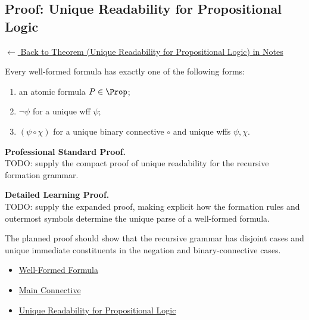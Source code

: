 \clearpage
\subsection*{Proof: Unique Readability for Propositional Logic}
\label{prf:unique-readability-propositional-logic}

\noindent\hyperref[thm:unique-readability-propositional-logic]{$\leftarrow$ Back to Theorem (Unique Readability for Propositional Logic) in Notes}

\begin{theorem*}
Every well-formed formula has exactly one of the following forms:
\begin{enumerate}
  \item an atomic formula $P\in\Prop$;
  \item $\neg\psi$ for a unique wff $\psi$;
  \item $(\psi\circ\chi)$ for a unique binary connective $\circ$ and unique
        wffs $\psi,\chi$.
\end{enumerate}
\end{theorem*}

\textbf{Professional Standard Proof.}~\\
TODO: supply the compact proof of unique readability for the recursive
formation grammar.

\medskip

\textbf{Detailed Learning Proof.}~\\
TODO: supply the expanded proof, making explicit how the formation rules and
outermost symbols determine the unique parse of a well-formed formula.

\begin{remark*}
The planned proof should show that the recursive grammar has disjoint cases and
unique immediate constituents in the negation and binary-connective cases.
\end{remark*}

\begin{dependencies}
\begin{itemize}
  \item \hyperref[def:well-formed-formula]{Well-Formed Formula}
  \item \hyperref[def:main-connective]{Main Connective}
  \item \hyperref[thm:unique-readability-propositional-logic]{Unique Readability for Propositional Logic}
\end{itemize}
\end{dependencies}

\clearpage
